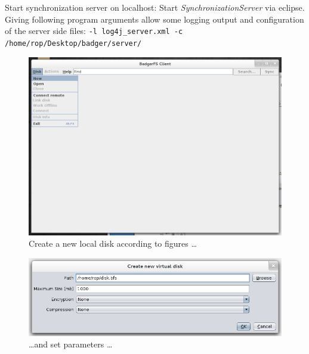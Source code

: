 Start synchronization server on localhost: Start
\textit{SynchronizationServer} via eclipse. Giving following program arguments
allow some logging output and configuration of the server side files:\newline 
\verb|-l log4j_server.xml -c /home/rop/Desktop/badger/server/|



\begin{figure}[h!]
\centering
\includegraphics[width=1\textwidth]{figures/serverUseCase/01_newDisk.png}
\caption{Create a new local disk according to figures \ldots}
\label{fig:01_newDisk.png}
\end{figure}

\begin{figure}[h!]
\centering
\includegraphics[width=1\textwidth]{figures/serverUseCase/02_newDisk2.png}
\caption{\ldots and set parameters \ldots}
\label{fig:02_newDisk2.png}
\end{figure}


